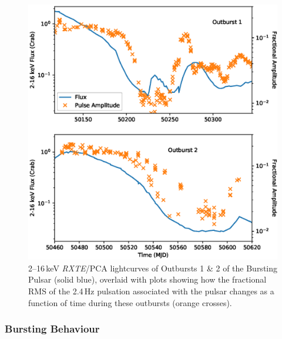 \begin{figure}
  \centering
  \includegraphics[width=.9\linewidth, trim={0.4cm 1cm 0cm 1cm},clip]{images/PulseAmp.eps}
  \caption[\textit{RXTE}/PCA lightcurves of Outbursts 1 \& 2 of the Bursting Pulsar, overlaid with plots showing how the fractional RMS of the 2.4\,Hz pulsation changes as a function of time.]{\small 2--16\,keV \textit{RXTE}/PCA lightcurves of Outbursts 1 \& 2 of the Bursting Pulsar (solid blue), overlaid with plots showing how the fractional RMS of the 2.4\,Hz pulsation associated with the pulsar changes as a function of time during these outbursts (orange crosses).}
  \label{fig:pulsovertime}
\end{figure}

\subsubsection{Bursting Behaviour}

